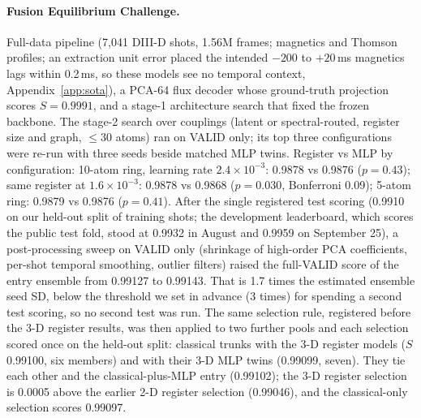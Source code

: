 \documentclass{article}
\begin{document}
\paragraph{Fusion Equilibrium Challenge.} Full-data pipeline (7{,}041 DIII-D shots, 1.56M frames; magnetics and Thomson
profiles; an extraction unit error placed the intended $-200$ to $+20$\,ms magnetics lags within 0.2\,ms, so these
models see no temporal context, Appendix~\ref{app:sota}), a PCA-64 flux decoder whose ground-truth projection scores $S = 0.9991$, and a stage-1
architecture search that fixed the frozen backbone. The stage-2 search over couplings (latent or spectral-routed,
register size and graph, $\le$30 atoms) ran on VALID only; its top three configurations were re-run with three seeds
beside matched MLP twins. Register vs MLP by configuration: 10-atom ring, learning rate $2.4{\times}10^{-3}$:
0.9878 vs 0.9876 ($p=0.43$); same register at $1.6{\times}10^{-3}$: 0.9878 vs 0.9868 ($p=0.030$, Bonferroni 0.09);
5-atom ring: 0.9879 vs 0.9876 ($p=0.41$). After the single registered test scoring (0.9910 on our held-out split of
training shots; the development leaderboard, which scores the public test fold, stood at 0.9932 in August and 0.9959 on
September 25), a
post-processing sweep on VALID only (shrinkage of high-order PCA coefficients, per-shot temporal smoothing, outlier
filters) raised the full-VALID score of the entry ensemble from 0.99127 to 0.99143. That is 1.7 times the estimated
ensemble seed SD, below the threshold we set in advance (3 times) for spending a second test scoring, so no second
test was run. The same selection rule, registered before the 3-D register results, was then applied to two further
pools and each selection scored once on the held-out split: classical trunks with the 3-D register models ($S$ 0.99100,
six members) and with their 3-D MLP twins (0.99099, seven). They tie each other and the classical-plus-MLP entry
(0.99102); the 3-D register selection is 0.0005 above the earlier 2-D register selection (0.99046), and the
classical-only selection scores 0.99097.
\end{document}
